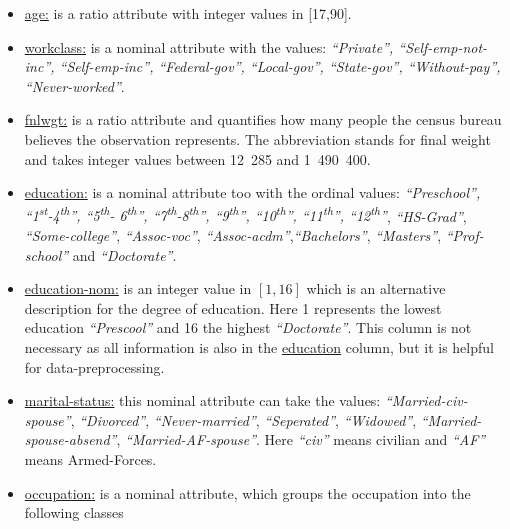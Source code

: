 \documentclass{scrartcl}[a4paper, 11pt]
\begin{document}
    \begin{itemize}
        \item \underline{age:} is a ratio attribute with integer values in [17,90].
        \item \underline{workclass:} is a nominal attribute with the values: \textit{\enquote{Private}, \enquote{Self-emp-not-inc}, \enquote{Self-emp-inc}, \enquote{Federal-gov}, \enquote{Local-gov}, \enquote{State-gov}, \enquote{Without-pay}, \enquote{Never-worked}}.
        \item \underline{fnlwgt:} is a ratio attribute and quantifies how many people the census bureau believes the observation represents. The abbreviation stands for final weight and takes integer values between 12~285 and 1~490~400. 
        \item \underline{education:} is a nominal attribute too with the ordinal values: \textit{\enquote{Preschool}, \enquote{1\textsuperscript{st}-4\textsuperscript{th}}, \enquote{5\textsuperscript{th}- 6\textsuperscript{th}}, 
        \enquote{7\textsuperscript{th}-8\textsuperscript{th}}, \enquote{9\textsuperscript{th}}, \enquote{10\textsuperscript{th}}, \enquote{11\textsuperscript{th}}, 
        \enquote{12\textsuperscript{th}}}, \textit{\enquote{HS-Grad}}, \textit{\enquote{Some-college}}, 
        \textit{\enquote{Assoc-voc}}, \textit{\enquote{Assoc-acdm}},\textit{\enquote{Bachelors}},
        \textit{\enquote{Masters}}, \textit{\enquote{Prof-school}} and \textit{\enquote{Doctorate}}.
        \item \underline{education-nom:} is an integer value in $[1,16]$ which is an alternative description for the degree of education. Here 1 represents the lowest education \textit{\enquote{Prescool}} and 16 the highest \textit{\enquote{Doctorate}}. This column is not necessary as all information is also in the \underline{education} column, but it is helpful for data-preprocessing.
        \item \underline{marital-status:} this nominal attribute can take the values: 
        \textit{\enquote{Married-civ-spouse}}, \textit{\enquote{Divorced}}, \textit{\enquote{Never-married}}, \textit{\enquote{Seperated}}, \textit{\enquote{Widowed}}, \textit{\enquote{Married-spouse-absend}}, \textit{\enquote{Married-AF-spouse}}. \linebreak Here \textit{\enquote{civ}} means civilian and 
        \textit{\enquote{AF}} means Armed-Forces.
        \item \underline{occupation:} is a nominal attribute, which groups the occupation into the following classes 

\end{itemize}
\end{document}
